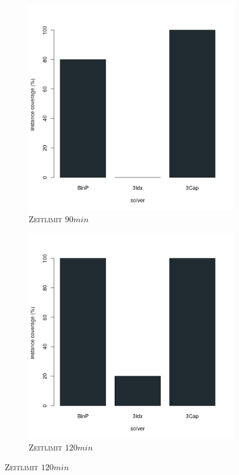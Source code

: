 \begin{figure}[H]
\begin{subfigure}[b]{0.3\textwidth}
\includegraphics[width=1.2\textwidth]{img/solver_instance_coverage_b=3_l_5400s.png}
\caption{\textsc{Zeitlimit} $90min$}
\label{fig:instance_coverage_b=3_l_b}
\end{subfigure}
\hfill
\begin{subfigure}[b]{0.3\textwidth}
\centering
\includegraphics[width=1.2\textwidth]{img/solver_instance_coverage_b=3_l_7200s.png}
\caption{\textsc{Zeitlimit} $120min$}
\label{fig:instance_coverage_b=3_l_c}
\end{subfigure}


\end{figure}
